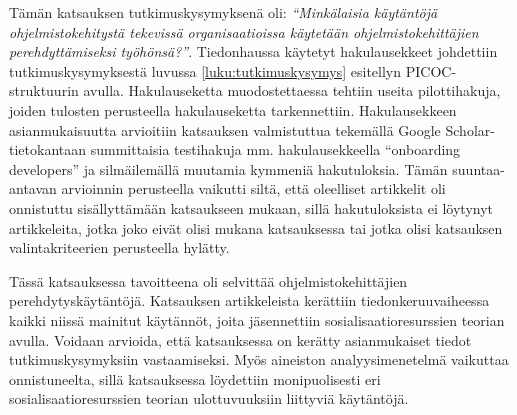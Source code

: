 \documentclass[utf8]{gradu3}
\begin{document}
Tämän katsauksen tutkimuskysymyksenä oli: \textit{“Minkälaisia käytäntöjä ohjelmistokehitystä tekevissä organisaatioissa käytetään ohjelmistokehittäjien perehdyttämiseksi työhönsä?”}. Tiedonhaussa käytetyt hakulausekkeet johdettiin tutkimuskysymyksestä luvussa \ref{luku:tutkimuskysymys} esitellyn PICOC-struktuurin avulla. Hakulauseketta muodostettaessa tehtiin useita pilottihakuja, joiden tulosten perusteella hakulauseketta tarkennettiin. Hakulausekkeen asianmukaisuutta arvioitiin katsauksen valmistuttua tekemällä Google Scholar-tietokantaan summittaisia testihakuja mm. hakulausekkeella “onboarding developers” ja silmäilemällä muutamia kymmeniä hakutuloksia. Tämän suuntaa-antavan arvioinnin perusteella vaikutti siltä, että oleelliset artikkelit oli onnistuttu sisällyttämään katsaukseen mukaan, sillä hakutuloksista ei löytynyt artikkeleita, jotka joko eivät olisi mukana katsauksessa tai jotka olisi katsauksen valintakriteerien perusteella hylätty. 

Tässä katsauksessa tavoitteena oli selvittää ohjelmistokehittäjien perehdytyskäytäntöjä. Katsauksen artikkeleista kerättiin tiedonkeruuvaiheessa kaikki niissä mainitut käytännöt, joita jäsennettiin sosialisaatioresurssien teorian avulla. Voidaan arvioida, että katsauksessa on kerätty asianmukaiset tiedot tutkimuskysymyksiin vastaamiseksi. Myös aineiston analyysimenetelmä vaikuttaa onnistuneelta, sillä katsauksessa löydettiin monipuolisesti eri sosialisaatioresurssien teorian ulottuvuuksiin liittyviä käytäntöjä.
\end{document}

